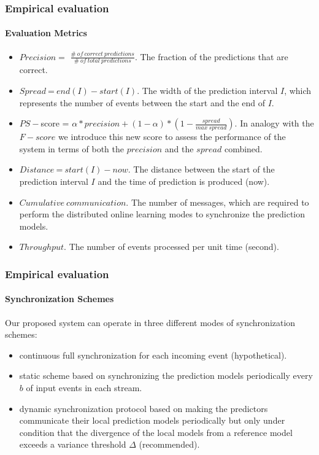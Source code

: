 
\begin{frame}
	
	\frametitle{Empirical evaluation}
	\framesubtitle{Evaluation Metrics}
	
	\begin{itemize}	
		\item<only@1>  $\mathit{Precision} =$ $ \mathit{\frac{\#\ of\ correct\ predictions}{\#\ of\ total\ predictions}}$. The fraction of the predictions that are correct.     
		\item<only@1> $\mathit{Spread}\ $=$\ end(I) -start(I)$. The width of the prediction interval $I$, which represents the number of events between the start and the end of $I$.
	
		\item<only@1> $\mathit{PS-}$score = $\alpha * precision + (1 - \alpha ) * ( 1- \frac{spread}{max\  spread})$. In analogy with the $F-score$ we introduce this new score to assess the performance of the system in terms of both the $\mathit{precision}$ and the $\mathit{spread}$ combined.
		\item<only@1> $\mathit{Distance}\ $=$\ start(I) - now$. The distance between the start of the prediction interval $I$ and the time of prediction is produced (now). 
		\item<only@2>  $\mathit{Cumulative\ communication}$. The number of messages, which are required to perform the distributed online learning modes to synchronize the prediction models.	
		\item<only@2> $Throughput$. The number of events processed per unit time (second).
	\end{itemize} 
	
\end{frame}


\begin{frame}
	
	\frametitle{Empirical evaluation}
	\framesubtitle{Synchronization Schemes}
	
	Our proposed system can operate in three different modes of synchronization schemes: 
	\begin{itemize}	
		\item continuous full synchronization for each incoming event (hypothetical).
		\item static scheme based on synchronizing the prediction models periodically every $b$ of input events in each stream.
		\item dynamic synchronization protocol based on making the predictors communicate their local prediction models periodically but only under condition that the divergence of the local models from a reference model exceeds a variance threshold $\Delta$ (recommended).  	   
		
	\end{itemize} 
	
\end{frame}





